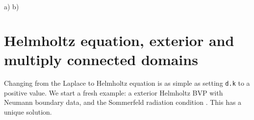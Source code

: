 \bfi %
a)
b)
\efi

\section{Helmholtz equation, exterior and multiply connected domains}
\label{s:ext}

Changing from the Laplace to Helmholtz equation is as simple
as setting {\tt d.k} to a positive value.
We start a fresh example: a exterior Helmholtz BVP
with Neumann boundary data, and the Sommerfeld radiation
condition \cite{coltonkress}. This has a unique solution.

